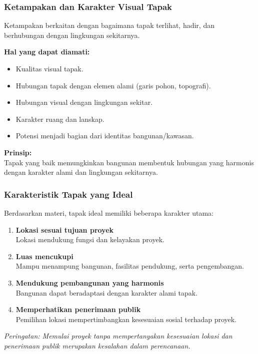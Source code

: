 \documentclass[../main.tex]{subfiles}
\begin{document}
\begin{frame}[mytitle=standard, t, mycolor=digiPH_cream, light]
	\frametitle{Ketampakan dan Karakter Visual Tapak}

	Ketampakan berkaitan dengan bagaimana tapak terlihat, hadir, dan berhubungan dengan lingkungan sekitarnya.

	\vspace{0.3cm}
	\textbf{Hal yang dapat diamati:}
	\begin{itemize}
		\item Kualitas visual tapak.
		\item Hubungan tapak dengan elemen alami (garis pohon, topografi).
		\item Hubungan visual dengan lingkungan sekitar.
		\item Karakter ruang dan lanskap.
		\item Potensi menjadi bagian dari identitas bangunan/kawasan.
	\end{itemize}

	\vspace{0.3cm}
	\textbf{Prinsip:}\\
	Tapak yang baik memungkinkan bangunan membentuk hubungan yang harmonis dengan karakter alami dan lingkungan sekitarnya.
\end{frame}

\begin{frame}[mytitle=standard, c, mycolor=digiPH_darkblue, dark]
	\frametitle{Karakteristik Tapak yang Ideal}

	Berdasarkan materi, tapak ideal memiliki beberapa karakter utama:

	\begin{enumerate}
		\item \textbf{Lokasi sesuai tujuan proyek}\\
		      Lokasi mendukung fungsi dan kelayakan proyek.
		\item \textbf{Luas mencukupi}\\
		      Mampu menampung bangunan, fasilitas pendukung, serta pengembangan.
		\item \textbf{Mendukung pembangunan yang harmonis}\\
		      Bangunan dapat beradaptasi dengan karakter alami tapak.
		\item \textbf{Memperhatikan penerimaan publik}\\
		      Pemilihan lokasi mempertimbangkan kesesuaian sosial terhadap proyek.
	\end{enumerate}

	\vspace{0.3cm}
	\footnotesize{\textit{Peringatan: Memulai proyek tanpa mempertanyakan kesesuaian lokasi dan penerimaan publik merupakan kesalahan dalam perencanaan.}}
\end{frame}
\end{document}
